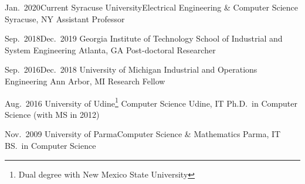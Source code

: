 
\begin{experiences}
  \job
    {Jan.~2020}{Current}
    {Syracuse University}{Electrical Engineering \& Computer Science}
    {Syracuse, NY}
    {Assistant Professor}
    \emptySeparator
    
    \job
    {Sep.~2018}{Dec.~2019}
    {Georgia Institute of Technology}
    {School of Industrial and System Engineering}
    {Atlanta, GA}
    {Post-doctoral Researcher}
    \emptySeparator

   \job
    {Sep.~2016}{Dec.~2018}
    {University of Michigan}
    {Industrial and Operations Engineering}
    {Ann Arbor, MI}
    {Research Fellow}
\end{experiences}


\begin{experiences}
  \job
    {}{Aug.~2016}
    {University of Udine\footnote{Dual degree with New Mexico State University}}
    {Computer Science}
    {Udine, IT}
    {Ph.D.~in Computer Science (with MS in 2012)}
  \emptySeparator



  \job
    {}{Nov.~2009}
    {University of Parma}{Computer Science \& Mathematics}
    {Parma, IT}
    {BS.~in Computer Science}

\end{experiences}
